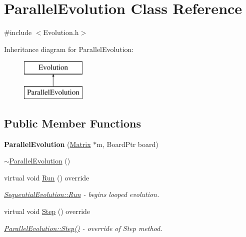 \hypertarget{classParallelEvolution}{}\section{Parallel\+Evolution Class Reference}
\label{classParallelEvolution}


{\ttfamily \#include $<$Evolution.\+h$>$}

Inheritance diagram for Parallel\+Evolution\+:\begin{figure}[H]
\begin{center}
\leavevmode
\includegraphics[height=2.000000cm]{classParallelEvolution}
\end{center}
\end{figure}
\subsection*{Public Member Functions}
\begin{DoxyCompactItemize}
\item 
\hypertarget{classParallelEvolution_aea99be457d740ed5e9bd0dd6ae9b9f02}{}{\bfseries Parallel\+Evolution} (\hyperlink{classMatrix}{Matrix} $\ast$m, Board\+Ptr board)\label{classParallelEvolution_aea99be457d740ed5e9bd0dd6ae9b9f02}

\item 
\hyperlink{classParallelEvolution_a129abf6f02846cbc63a5cf1a1111a9e7}{$\sim$\+Parallel\+Evolution} ()
\item 
virtual void \hyperlink{classParallelEvolution_a3a8c4d586560d929f7a8edfab1cced5e}{Run} () override
\begin{DoxyCompactList}\small\item\em \hyperlink{classSequentialEvolution_aa4906c7ab5d634a8489540eea449b9ff}{Sequential\+Evolution\+::\+Run} -\/ begins looped evolution. \end{DoxyCompactList}\item 
virtual void \hyperlink{classParallelEvolution_ae4d4774e463fab06050c50645fa702e9}{Step} () override
\begin{DoxyCompactList}\small\item\em \hyperlink{classParallelEvolution_ae4d4774e463fab06050c50645fa702e9}{Parallel\+Evolution\+::\+Step()} -\/ override of Step method. \end{DoxyCompactList}\end{DoxyCompactItemize}


